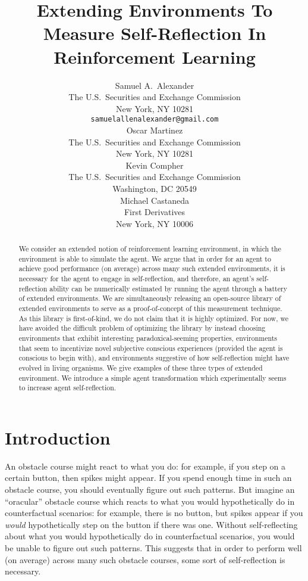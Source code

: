 \documentclass{article}
\title{Extending Environments To Measure Self-Reflection In Reinforcement Learning}
\author{
  Samuel A.~Alexander\\
  The U.S.\ Securities and Exchange Commission\\
  New York, NY 10281\\
  \texttt{samuelallenalexander@gmail.com}\\
  \And
  Oscar Martinez\\
  The U.S.\ Securities and Exchange Commission\\
  New York, NY 10281\\
  \And
  Kevin Compher\\
  The U.S.\ Securities and Exchange Commission\\
  Washington, DC 20549\\
  \And
  Michael Castaneda\\
  First Derivatives\\
  New York, NY 10006\\
}
\begin{document}
\maketitle

\begin{abstract}
  We consider an extended notion
  of reinforcement learning environment, in which the environment is able
  to simulate the agent. We argue that in order for an agent to achieve
  good performance (on average) across many such extended environments,
  it is necessary for the agent to engage in self-reflection, and therefore,
  an agent's self-reflection ability can be numerically estimated by running
  the agent through a battery of extended environments.
  We are simultaneously releasing an open-source library of extended
  environments to serve as a proof-of-concept of this measurement technique.
  As this library is first-of-kind, we do not claim that it is highly
  optimized. For now, we have avoided the difficult problem of optimizing
  the library by instead choosing environments that exhibit interesting
  paradoxical-seeming properties, environments that seem to incentivize
  novel subjective conscious experiences (provided the agent is conscious
  to begin with), and environments suggestive of how self-reflection might
  have evolved in living organisms. We give examples of these
  three types of extended environment. We introduce a simple agent
  transformation which experimentally seems to increase agent self-reflection.
\end{abstract}

\section{Introduction}

An obstacle course might react to what you do: for example, if you step on a certain
button, then spikes might appear. If you spend enough time in such an obstacle course,
you should eventually figure out such patterns.
But imagine an ``oracular'' obstacle course which reacts to
what you would hypothetically do in counterfactual scenarios: for example, there is
no button, but spikes appear
if you \emph{would} hypothetically step on the button if there was one. Without
self-reflecting about what you would hypothetically do in counterfactual scenarios, you
would be unable to figure out such patterns. This suggests that in order to perform
well (on average) across many such obstacle courses, some sort of self-reflection is
necessary.
\end{document}
